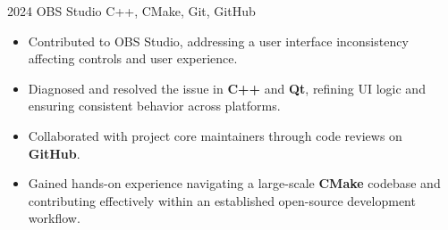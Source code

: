 \documentclass[9pt]{developercv} %
\begin{document}
\begin{entrylist}
    \entry 
        {2024}
        {OBS Studio}
        {C++, CMake, Git, GitHub}
        {
        \vspace*{-\baselineskip}
        \begin{itemize}
          \item Contributed to OBS Studio, addressing a user interface
            inconsistency affecting controls and user experience.

          \item Diagnosed and resolved the issue in \textbf{C++} and \textbf{Qt}, refining UI
            logic and ensuring consistent behavior across platforms.

          \item Collaborated with project core maintainers through code reviews on
            \textbf{GitHub}.

          \item Gained hands-on experience navigating a large-scale \textbf{CMake}
            codebase and contributing effectively within an established
            open-source development workflow.
        \end{itemize}
        }
\end{entrylist}




\end{document}
